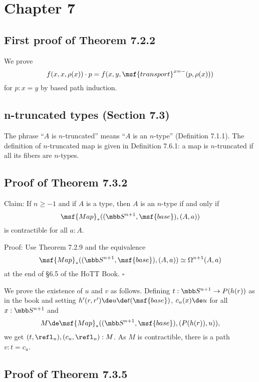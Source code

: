 \documentclass[12pt]{article}
\begin{document}

\section{Chapter 7}


\subsection{First proof of Theorem 7.2.2}

We prove 
$$
f(x,x,\rho(x))\cdot p=f(x,y,\msf{transport}^{x=-}(p,\rho(x)))
$$ 
for $p:x=y$ by based path induction.


\subsection{n-truncated types (Section 7.3)}

The phrase ``$A$ is $n$-truncated'' means ``$A$ is an $n$-type'' (Definition 7.1.1). The definition of $n$-truncated map is given in Definition 7.6.1: a map is $n$-truncated if all its fibers are $n$-types.


\subsection{Proof of Theorem 7.3.2}

Claim: If $n\ge-1$ and if $A$ is a type, then $A$ is an $n$-type if and only if $$\msf{Map}_*((\mbb S^{n+1},\msf{base}),(A,a))$$ is contractible for all $a:A$.

\nn Proof: Use Theorem 7.2.9 and the equivalence 
$$
\msf{Map}_*((\mbb S^{n+1},\msf{base}),(A,a))\simeq\Omega^{n+1}(A,a)
$$ 
at the end of \S6.5 of the HoTT Book. $\square$

We prove the existence of $u$ and $v$ as follows. Defining $t:\mbb S^{n+1}\to P(h(r))$ as in the book and setting $h'(r,r')\de u\de t(\msf{base})$, $c_u(x)\de u$ for all $x:\mbb S^{n+1}$ and 
$$
M\de\msf{Map}_*((\mbb S^{n+1},\msf{base}),(P(h(r)),u)),
$$ 
we get $(t,\refl_u),(c_u,\refl_u):M$. As $M$ is contractible, there is a path $v:t=c_u$.


\subsection{Proof of Theorem 7.3.5}
\end{document}
